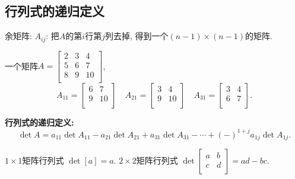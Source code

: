 \subsection{行列式的递归定义}
\begin{definition}
  余矩阵: $A_{ij}$: 把$A$的第$i$行第$j$列去掉, 得到一个$ \left( n-1 \right) \times  \left( n-1 \right) $的矩阵.
\end{definition}
\begin{example}
  一个矩阵$A = \begin{bmatrix}
   2 & 3 & 4\\
   5 & 6 & 7\\
   8 & 9 & 10\\
  \end{bmatrix}$,
  \begin{equation}
    A_{11} = \begin{bmatrix}
     6 & 7\\
     9 & 10\\
    \end{bmatrix}
    \quad
    A_{21} = \begin{bmatrix}
     3 & 4\\
     9 & 10\\
    \end{bmatrix}
    \quad
    A_{31} = \begin{bmatrix}
     3 & 4\\
     6 & 7\\
    \end{bmatrix}.
  \end{equation}
\end{example}

\textbf{行列式的递归定义:}
\begin{equation}\boxed{
\det A = a_{11} \det A_{11} - a_{21} \det A_{21} + a_{31} \det A_{31} - \cdots + \left( - \right) ^{1+j} a_{1j} \det A_{1j}. }
\end{equation}

\begin{example}
  $1 \times 1$矩阵行列式 $\det [a] = a$.
  $2 \times 2$矩阵行列式 $\det \begin{bmatrix}
   a & b\\
   c & d\\
  \end{bmatrix} = ad - bc.$
\end{example}